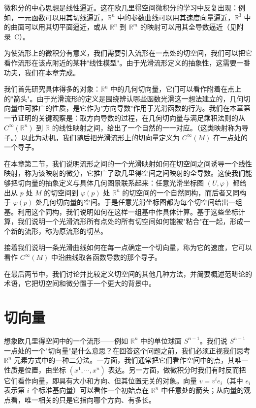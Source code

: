 \documentclass[../../main.tex]{subfiles}
\begin{document}
微积分的中心思想是线性逼近。这在欧几里得空间微积分的学习中反复出现：例如，一元函数可以用其切线逼近，$\mathbb{R}^{n}$ 中的参数曲线可以用其速度向量逼近，$\mathbb{R}^{3}$ 中的曲面可以用其切平面逼近，或从 $\mathbb{R}^{n}$ 到 $\mathbb{R}^{m}$ 的映射可以用其全导数逼近（见附录~C）。

为使流形上的微积分有意义，我们需要引入流形在一点处的切空间，我们可以把它看作流形在该点附近的某种"线性模型"。由于光滑流形定义的抽象性，这需要一番功夫，我们在本章完成。

我们首先研究具体得多的对象：$\mathbb{R}^{n}$ 中的几何切向量，它们可以看作附着在点上的"箭头"。由于光滑流形的定义是围绕辨认哪些函数光滑这一想法建立的，几何切向量中可推广的性质，是它作为"方向导数"作用于光滑函数的行为。我们在本章第一节证明的关键观察是：取方向导数的过程，在几何切向量与满足乘积法则的从 $C^{\infty}(\mathbb{R}^{n})$ 到 $\mathbb{R}$ 的线性映射之间，给出了一个自然的一一对应。（这类映射称为导子。）以此为动机，我们随后把光滑流形上的切向量定义为 $C^{\infty}(M)$ 在一点处的一个导子。

在本章第二节，我们说明流形之间的一个光滑映射如何在切空间之间诱导一个线性映射，称为该映射的微分，它推广了欧几里得空间之间映射的全导数。这使我们能够把切向量的抽象定义与具体几何图景联系起来：任意光滑坐标图 $(U,\varphi)$ 都给出从 $p$ 处 $M$ 的切空间到 $\varphi(p)$ 处 $\mathbb{R}^{n}$ 的切空间的一个自然同构，而后者又同构于 $\varphi(p)$ 处几何切向量的空间。于是任意光滑坐标图都为每个切空间给出一组基。利用这个同构，我们说明如何在这样一组基中作具体计算。基于这些坐标计算，我们说明一个光滑流形所有点处的所有切空间如何能被"粘合"在一起，形成一个新的流形，称为原流形的切丛。

接着我们说明一条光滑曲线如何在每一点确定一个切向量，称为它的速度，它可以看作 $C^{\infty}(M)$ 中沿曲线取各函数导数的那个导子。

在最后两节中，我们讨论并比较定义切空间的其他几种方法，并简要概述范畴论的术语，它把切空间和微分置于一个更大的背景中。

\section{切向量}\label{section:ch03-切向量}

想象欧几里得空间中的一个流形——例如 $\mathbb{R}^{n}$ 中的单位球面 $S^{n-1}$。我们说 $S^{n-1}$ 一点处的一个"切向量"是什么意思？在回答这个问题之前，我们必须正视我们思考 $\mathbb{R}^{n}$ 元素方式中的一种二分法。一方面，我们通常把它们看作空间中的点，其唯一性质是位置，由坐标 $(x^{1},\cdots ,x^{n})$ 表达。另一方面，做微积分时我们有时反而把它们看作向量，即具有大小和方向、但其位置无关的对象。向量 $v=v^{i}e_{i}$（其中 $e_{i}$ 表示第 $i$ 个标准基向量）可以看作一个初始点在 $\mathbb{R}^{n}$ 中任意处的箭头；从向量的观点看，唯一相关的只是它指向哪个方向、有多长。
\end{document}

